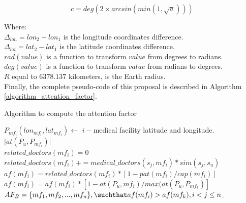 \documentclass[sustainability,article,submit,pdftex,moreauthors]{Definitions/mdpi}
\begin{document}
\begin{equation}
\label{eq_c}
c = deg \left( 2 \times arcsin \left( min(1, \sqrt{a}) \right) \right)
\end{equation}

Where: \\
$\Delta_{lon}=lon_2 - lon_1$ is the longitude coordinates difference. \\ 
$\Delta_{lat}=lat_2 - lat_1$ is the latitude coordinates difference. \\
$rad(value)$ is a function to transform $value$ from degrees to radians. \\
$deg(value)$ is a function to transform $value$ from radians to degrees. \\
$R$ equal to $6378.137$ kilometers, is the Earth radius. \\

Finally, the complete pseudo-code of this proposal is described in Algorithm \ref{algorithm_attention_factor}.


\begin{algorithm}
\caption{Algorithm to compute the attention factor}
\label{algorithm_attention_factor}

 {
    $P_{mf_{i}}(lon_{mf_i}, lat_{mf_i}) \gets$  $i-$medical facility latitude and longitude. \\
    $\lvert{at(P_{u}, P_{mf_{i}})}\rvert$ \\
    $related\_doctors(mf_{i})=0$ \\
     {
        $related\_doctors(mf_{i}) += medical\_doctors(s_j, mf_{i}) *  sim(s_j, s_u)$ \\     
	}
    $af(mf_{i}) = related\_doctors(mf_{i})*[1 - pat(mf_{i}) / cap(mf_{i})]$ \\
    $af(mf_{i}) = af(mf_{i}) * [1 - at(P_u, mf_{i}) / max(at(P_u, P_{mf_k})]$
}
$AF_{B} = \{ mf_{1}, mf_{2}, ..., mf_{n} \}, \suchthat  af(mf_{i}) > af(mf_{k}), i<j \leq n$. \\
\BlankLine
\end{algorithm}
\end{document}
